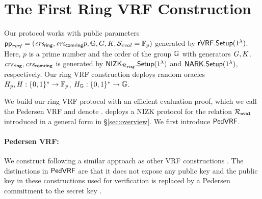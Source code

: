 
\def\tmpaux{\aux \doubleplus \piring \doubleplus \comring}
\def\tmpeprintaux{\eprint{\aux'}{\tmpaux}}
\def\tmpindent{\hspace*{5pt}}
\section{The First Ring VRF Construction}%
\label{sec:pederson_vrf}



Our  protocol works with public parameters $ \mathsf{pp}_{\mathit{rvrf}} = (\mathit{crs_{\mathsf{ring}}},\mathit{crs_{\mathsf{comring}}} p,{\mathbb{G}}, G,K, {\mathcal{S}}_{eval}  = \mathbb{F}_p)$ generated by $ {\mathsf{rVRF}}.{\mathsf{Setup}}(1^\lambda) $. Here, $ p $ is a prime number and the order of the group $ {\mathbb{G}} $ with generators $ G,K $.  $ \mathit{crs_{\mathsf{ring}}}, \mathit{crs_{\mathsf{comring}}} $ is  generated by $ {\mathsf{NIZK}}_{\mathcal{R}_{\mathtt{ring}}}.{\mathsf{Setup}}(1^\lambda) $ and $ \mathsf{NARK}.{\mathsf{Setup}}(1^\lambda) $, respectively. Our ring VRF construction deploys random oracles $H_p,H: \{0,1\}^* \to \mathbb{F}_p$, $H_{{\mathbb{G}}}: \{0,1\}^* \to {\mathbb{G}}$.


We build our  ring VRF protocol with an efficient evaluation proof, which
we call the Pedersen VRF and denote \PedVRF.
\PedVRF deploys a NIZK protocol for the relation $\mathcal{R}_{\mathtt{eval}}$ introduced in a general form 
in \S\ref{sec:overview}.  We first introduce $ {\mathsf{PedVRF}} $.




\paragraph{Pedersen VRF:} 
We construct \PedVRF following a similar approach as  other VRF constructions
\cite{nsec5,VXEd25519,draft-irtf-cfrg-vrf-10}. The distinctions in $ {\mathsf{PedVRF}} $ are that it does not expose any public key and the public key in these constructions used for verification is replaced  by a Pedersen commitment to the secret key \sk.

